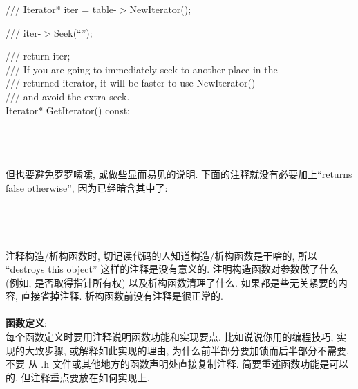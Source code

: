 \documentclass[a4paper,11pt,CJK]{article}
\begin{document}
\begin{CJK}{UTF8}{gbsn}
{\begin{minipage}{400pt}
\indent ///\hspace{3ex}    Iterator* iter = table-$>$NewIterator();\par
\indent ///\hspace{3ex}    iter-$>$Seek(``'');\par
\indent ///\hspace{3ex}    return iter;\\
\indent /// If you are going to immediately seek to another place in the\\
\indent /// returned iterator, it will be faster to use NewIterator()\\
\indent /// and avoid the extra seek.\\
\indent Iterator* GetIterator() const;
\end{minipage}
}
\\
\\
\\
\indent 但也要避免罗罗嗦嗦, 或做些显而易见的说明. 下面的注释就没有必要加上``returns false otherwise'', 因为已经暗含其中了:
\\
\\
\\
\\
\\
\indent 注释构造/析构函数时, 切记读代码的人知道构造/析构函数是干啥的, 所以 ``destroys this object'' 这样的注释是没有意义的. 注明构造函数对参数做了什么 (例如, 是否取得指针所有权) 以及析构函数清理了什么. 如果都是些无关紧要的内容, 直接省掉注释. 析构函数前没有注释是很正常的.\\
\\
\textbf{函数定义}:\\
\indent 每个函数定义时要用注释说明函数功能和实现要点. 比如说说你用的编程技巧, 实现的大致步骤, 或解释如此实现的理由, 为什么前半部分要加锁而后半部分不需要.\\
\indent 不要 从 .h 文件或其他地方的函数声明处直接复制注释. 简要重述函数功能是可以的, 但注释重点要放在如何实现上.


\end{CJK}
\end{document}

